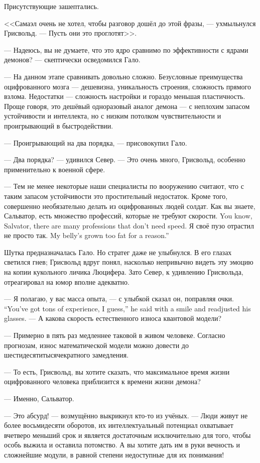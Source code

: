 Присутствующие зашептались.

<<Самаэл очень не хотел, чтобы разговор дошёл до этой фразы, --- ухмыльнулся Грисвольд.
--- Пусть они это проглотят>>.

--- Надеюсь, вы не думаете, что это ядро сравнимо по эффективности с ядрами демонов? --- скептически осведомился Гало.

--- На данном этапе сравнивать довольно сложно.
Безусловные преимущества оцифрованного мозга --- дешевизна, уникальность строения, сложность прямого взлома.
Недостатки --- сложность настройки и гораздо меньшая пластичность.
Проще говоря, это дешёвый одноразовый аналог демона --- с неплохим запасом устойчивости и интеллекта, но с низким потолком чувствительности и проигрывающий в быстродействии.

--- Проигрывающий на два порядка, --- присовокупил Гало.

--- Два порядка? --- удивился Север.
--- Это очень много, Грисвольд, особенно применительно к военной сфере.

--- Тем не менее некоторые наши специалисты по вооружению считают, что с таким запасом устойчивости это простительный недостаток.
Кроме того, совершенно необязательно делать из оцифрованных людей солдат.
{Как вы знаете, Сальватор, есть множество профессий, которые не требуют скорости.}
{You know, Salvator, there are many professions that don't need speed.}
{Я своё пузо отрастил не просто так.}
{My belly's grown too fat for a reason.''}

Шутка предназначалась Гало.
Но стратег даже не улыбнулся.
В его глазах светился гнев;
Грисвольд вдруг понял, насколько непривычно видеть эту эмоцию на копии кукольного личика Люцифера.
Зато Север, к удивлению Грисвольда, отреагировал на юмор вполне адекватно.

{--- Я полагаю, у вас масса опыта, --- с улыбкой сказал он, поправляя очки.}
{``You've got tons of experience, I guess,'' he said with a smile and readjusted his glasses.}
--- А какова скорость естественного износа квантовой модели?

--- Примерно в пять раз медленнее таковой в живом человеке.
Согласно прогнозам, износ математической модели можно довести до шестидесятитысячекратного замедления.

--- То есть, Грисвольд, вы хотите сказать, что максимальное время жизни оцифрованного человека приблизится к времени жизни демона?

--- Именно, Сальватор.

--- Это абсурд! --- возмущённо выкрикнул кто-то из учёных.
--- Люди живут не более восьмидесяти оборотов, их интеллектуальный потенциал охватывает вчетверо меньший срок и является достаточным исключительно для того, чтобы особь выжила и оставила потомство.
А вы хотите дать им в руки вечность и сложнейшие модули, в равной степени недоступные для их понимания!

